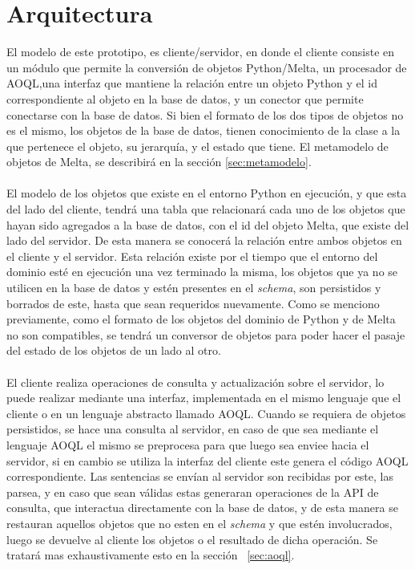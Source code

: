 \documentclass{melta}
\begin{document}
\section{Arquitectura}
\label{sec:arquitectura}
El modelo de este prototipo, es cliente/servidor, en donde el cliente consiste en un módulo que permite la conversión de objetos Python/Melta, un procesador de AOQL,una interfaz que mantiene la relación entre un objeto Python y el id correspondiente al objeto en la base de datos, y un conector que permite conectarse con la base de datos. Si bien el formato de los dos tipos de objetos no es el mismo, los objetos de la base de datos, tienen conocimiento de la clase a la que pertenece el objeto, su jerarquía, y el estado que tiene. El metamodelo de objetos de Melta, se describirá en la sección \ref{sec:metamodelo}.
\\\\
El modelo de los objetos que existe en el entorno Python en ejecución, y que esta del lado del cliente, tendrá una tabla que relacionará cada uno de los objetos que hayan sido agregados a la base de datos, con el id del objeto Melta, que existe del lado del servidor. De esta manera se conocerá la relación entre ambos objetos en el cliente y el servidor. Esta relación existe por el tiempo que el entorno del dominio esté en ejecución una vez terminado la misma, los objetos que ya no se utilicen en la base de datos y estén presentes en el \textit{schema}, son persistidos y borrados de este, hasta que sean requeridos nuevamente. Como se menciono previamente, como el formato de los objetos del dominio de Python y de Melta no son compatibles, se tendrá un conversor de objetos para poder hacer el pasaje del estado de los objetos de un lado al otro.
\\\\
El cliente realiza operaciones de consulta y actualización sobre el servidor, lo puede realizar mediante una interfaz, implementada en el mismo lenguaje que el cliente o en un lenguaje abstracto llamado AOQL. Cuando se requiera de objetos persistidos, se hace una consulta al servidor, en caso de que sea mediante el lenguaje AOQL el mismo se preprocesa para que luego sea enviee hacia el servidor, si en cambio se utiliza la interfaz del cliente este genera el código AOQL correspondiente. Las sentencias se envían al servidor son recibidas por este, las parsea, y en caso que sean válidas estas generaran operaciones de la API de consulta, que interactua directamente con la base de datos, y de esta manera se restauran aquellos objetos que no esten en el \textit{schema} y que estén involucrados, luego se devuelve al cliente los objetos o el resultado de dicha operación. Se tratará mas exhaustivamente esto en la sección ~\ref{sec:aoql}.
\end{document}
